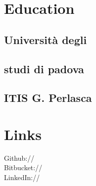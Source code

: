 \documentclass[]{deedy-resume-openfont}
\begin{document}
\begin{minipage}[t]{0.33\textwidth} 


\section{Education} 

\subsection{Università degli}
\subsection{studi di padova}
\sectionsep

\subsection{ITIS G. Perlasca}
\sectionsep


\section{Links} 
Github:// \href{https://github.com/gmarraffa}{} \\
Bitbucket://  \href{https://bitbucket.org/Maztek/}{} \\
LinkedIn://  \href{https://www.linkedin.com/in/gianluca-marraffa/}{} 
\sectionsep



\end{minipage}
\end{document}
